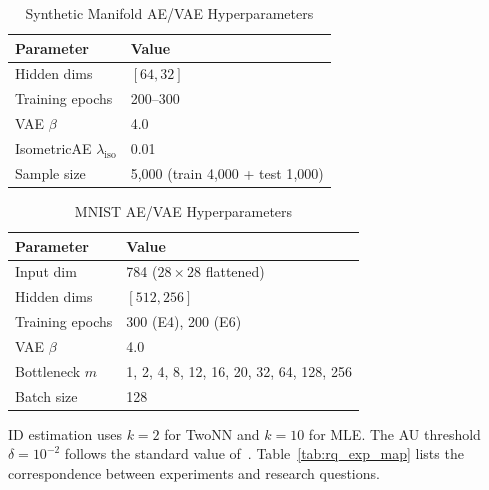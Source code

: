 \documentclass[lettersize,journal]{IEEEtran}
\begin{document}
\begin{table}[!t]
\centering
\caption{Synthetic Manifold AE/VAE Hyperparameters}
\label{tab:synthetic_hp}
\begin{tabular}{ll}
\toprule
Parameter & Value \\
\midrule
Hidden dims & $[64, 32]$ \\
Training epochs & 200--300 \\
VAE $\beta$ & 4.0 \\
IsometricAE $\lambda_\mathrm{iso}$ & 0.01 \\
Sample size & 5{,}000 (train 4{,}000 + test 1{,}000) \\
\bottomrule
\end{tabular}
\end{table}

\begin{table}[!t]
\centering
\caption{MNIST AE/VAE Hyperparameters}
\label{tab:mnist_hp}
\begin{tabular}{ll}
\toprule
Parameter & Value \\
\midrule
Input dim & 784 ($28\times28$ flattened) \\
Hidden dims & $[512, 256]$ \\
Training epochs & 300 (E4), 200 (E6) \\
VAE $\beta$ & 4.0 \\
Bottleneck $m$ & 1, 2, 4, 8, 12, 16, 20, 32, 64, 128, 256 \\
Batch size & 128 \\
\bottomrule
\end{tabular}
\end{table}

ID estimation uses $k=2$ for TwoNN and $k=10$ for MLE.
The AU threshold $\delta = 10^{-2}$ follows the standard value of~\cite{lucas2019elbo}.
Table~\ref{tab:rq_exp_map} lists the correspondence between experiments and research questions.
\end{document}
